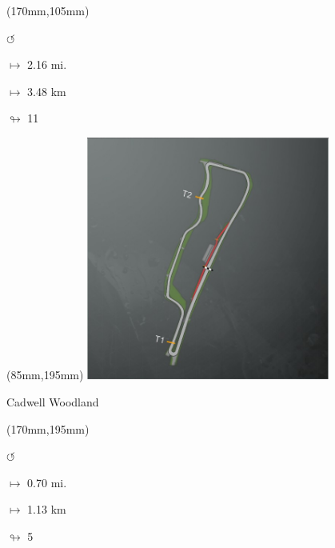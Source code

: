\begin{textblock*}{30mm}(170mm,105mm)%
\par \Huge$\circlearrowleft$
\Large
\par$\mapsto$ 2.16 mi.
\par$\mapsto$ 3.48 km
\par$\looparrowright$ 11
\end{textblock*}
\begin{textblock*}{80mm}(85mm,195mm)%
\includegraphics[width=80mm]{TR/2015-05-20_00012.png}
\centerline{Cadwell Woodland}
\end{textblock*}
\begin{textblock*}{30mm}(170mm,195mm)%
\par \Huge$\circlearrowleft$
\Large
\par$\mapsto$ 0.70 mi.
\par$\mapsto$ 1.13 km
\par$\looparrowright$ 5
\end{textblock*}
\null\newpage

